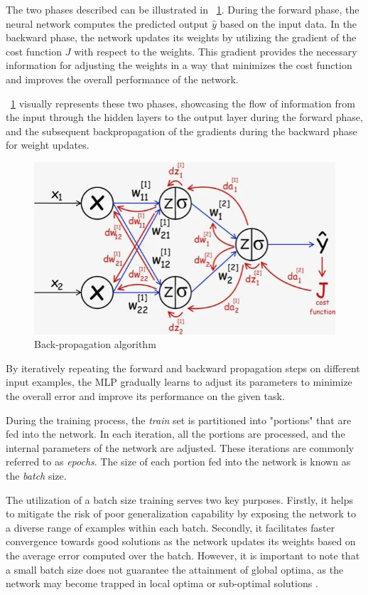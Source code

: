 The two phases described can be illustrated in \Fig~\ref{fig:backprop}. During the forward phase, the neural network computes the predicted output $\hat{y}$ based on the input data. In the backward phase, the network updates its weights by utilizing the gradient of the cost function $J$ with respect to the weights. This gradient provides the necessary information for adjusting the weights in a way that minimizes the cost function and improves the overall performance of the network.

\Fig~\ref{fig:backprop} visually represents these two phases, showcasing the flow of information from the input through the hidden layers to the output layer during the forward phase, and the subsequent backpropagation of the gradients during the backward phase for weight updates.

\begin{figure}[h]
	\centering
	\includegraphics[width=0.6\linewidth]{ImageFiles/NeuralNetworks/backprop}
	\caption{Back-propagation algorithm \cite{UIBASP}}
	\label{fig:backprop}
\end{figure}

By iteratively repeating the forward and backward propagation steps on different input examples, the MLP gradually learns to adjust its parameters to minimize the overall error and improve its performance on the given task. 



During the training process, the \textit{train} set is partitioned into "portions" that are fed into the network. In each iteration, all the portions are processed, and the internal parameters of the network are adjusted. These iterations are commonly referred to as \textit{epochs}. The size of each portion fed into the network is known as the \textit{batch} size.

The utilization of a batch size training serves two key purposes. Firstly, it helps to mitigate the risk of poor generalization capability by exposing the network to a diverse range of examples within each batch. Secondly, it facilitates faster convergence towards good solutions as the network updates its weights based on the average error computed over the batch. However, it is important to note that a small batch size does not guarantee the attainment of global optima, as the network may become trapped in local optima or sub-optimal solutions \cite{KANDEL2020312}.

